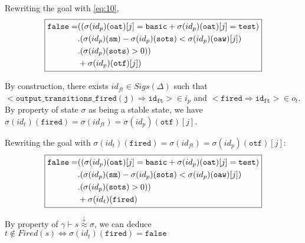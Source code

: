 \documentclass[dvipsnames,12pt]{article}
\begin{document}
\begin{niproof}
\begin{itemize}
\begin{itemize}
\begin{itemize}
        Rewriting the goal with \eqref{eq:10},
        \begin{equation*}
          \fbox{$\begin{split}
              \mathtt{false}=& ((\sigma(id_p)(\texttt{oat})[j]=\mathtt{basic}+\sigma(id_p)(\texttt{oat})[j]=\mathtt{test}) \\
              & .(\sigma(id_p)(\texttt{sm})-\sigma(id_p)(\texttt{sots})<\sigma(id_p)(\texttt{oaw})[j])\\
              & .(\sigma(id_p)(\texttt{sots})>0))\\
              & +\sigma(id_p)(\texttt{otf})[j]) \\
            \end{split}$}
        \end{equation*}
        
        By construction, there exists $id_{ft}\in{}Sigs(\Delta)$ such that\\
        ${<}\mathtt{output\_transitions\_fired(j)\Rightarrow{}id_{ft}}{>}\in{}i_p$
        and ${<}\mathtt{fired\Rightarrow{}id_{ft}}{>}\in{}o_t$. By
        property of state $\sigma$ as being a stable state, we have
        $\sigma(id_t)(\texttt{fired})=\sigma(id_{ft})=\sigma(id_p)(\texttt{otf})[j]$.

        Rewriting the goal with
        $\sigma(id_t)(\texttt{fired})=\sigma(id_{ft})=\sigma(id_p)(\texttt{otf})[j]$:
        \begin{equation*}
          \fbox{$\begin{split}
              \mathtt{false}=& ((\sigma(id_p)(\texttt{oat})[j]=\mathtt{basic}+\sigma(id_p)(\texttt{oat})[j]=\mathtt{test}) \\
              & .(\sigma(id_p)(\texttt{sm})-\sigma(id_p)(\texttt{sots})<\sigma(id_p)(\texttt{oaw})[j])\\
              & .(\sigma(id_p)(\texttt{sots})>0))\\
              & +\sigma(id_t)(\texttt{fired}) \\
            \end{split}$}
        \end{equation*}

        By property of
        $\gamma\vdash{}s\stackrel{\downarrow}{\approx}\sigma$, we can
        deduce
        $t\notin{}Fired(s)\Leftrightarrow\sigma(id_t)(\texttt{fired})=\mathtt{false}$


\end{itemize}
\end{itemize}
\end{itemize}
\end{niproof}
\end{document}
